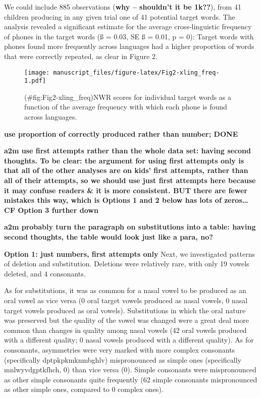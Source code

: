 \documentclass[english,,man,floatsintext]{apa6}
\begin{document}
We could include 885 observations (\textbf{why -- shouldn't it be
1k??}), from 41 children producing in any given trial one of 41
potential target words. The analysis revealed a significant estimate for
the average cross-linguistic frequency of phones in the target words (ß
= 0.03, SE ß = 0.01, p = 0): Target words with phones found more
frequently across languages had a higher proportion of words that were
correctly repeated, as clear in Figure 2.

\begin{figure}
\centering
\texttt{[image: manuscript\_files/figure-latex/Fig2-xling\_freq-1.pdf]}
\caption{(\#fig:Fig2-xling\_freq)NWR scores for individual target words
as a function of the average frequency with which each phone is found
across languages.}
\end{figure}

\textbf{use proportion of correctly produced rather than number; DONE}

\textbf{a2m use first attempts rather than the whole data set: having
second thoughts. To be clear: the argument for using first attempts only
is that all of the other analyses are on kids' first attempts, rather
than all of their attempts, so we should use just first attempts here
because it may confuse readers \& it is more consistent. BUT there are
fewer mistakes this way, which is Options 1 and 2 below has lots of
zeros\ldots{} CF Option 3 further down}

\textbf{a2m probably turn the paragraph on substitutions into a table:
having second thoughts, the table would look just like a para, no?}

\textbf{Option 1: just numbers, first attempts only } Next, we
investigated patterns of deletion and substitution. Deletions were
relatively rare, with only 19 vowels deleted, and 4 consonants.

As for substitutions, it was as common for a nasal vowel to be produced
as an oral vowel as vice versa (0 oral target vowels produced as nasal
vowels, 0 nasal target vowels produced as oral vowels). Substitutions in
which the oral nature was preserved but the quality of the vowel was
changed were a great deal more common than changes in quality among
nasal vowels (42 oral vowels produced with a different quality; 0 nasal
vowels produced with a different quality). As for consonants,
asymmetries were very marked with more complex consonants (specifically
dptpkpkmknmbghlv) mispronounced as simple ones (specifically
mnlwyvdgptkfhch, 0) than vice versa (0). Simple consonants were
mispronounced as other simple consonants quite frequently (62 simple
consonants mispronounced as other simple ones, compared to 0 complex
ones).
\end{document}
